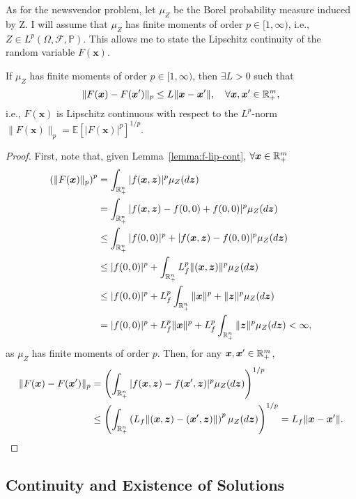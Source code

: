 \documentclass[12pt]{article}
\begin{document}
As for the newsvendor problem, let $\mu_Z$ be the Borel probability measure induced by Z.
I will assume that $\mu_Z$ has finite moments of order $p\in [1,\infty)$, i.e., $Z \in L^{p}(\Omega,\mathcal{F},\mathbb{P})$.
This allows me to state the Lipschitz continuity of the random variable $F(\bm{x})$.
\begin{lemma}[\citet{burtscheidtBilevelLinearOptimization2020}, Lemma~17.2.4\footnote{Except the case for probability measures with finite moments of order $p=\infty$.}]\label{lemma:F-lip-cont}
    If $\mu_Z$ has finite moments of order $p\in [1,\infty)$, then $\exists L>0$ such that \[
	\|F(\bm{x}) - F(\bm{x}')\|_p \le L \|\bm{x} - \bm{x}'\|,\quad \forall \bm{x},\bm{x}' \in \mathbb{R}^{m}_{+}
    ,\] i.e., $F(\bm{x})$ is Lipschitz continuous with respect to the $L^p$-norm $\|F(\bm{x})\|_p = \mathbb{E}[|F(\bm{x})|^{p}]^{1 / p}$.
\end{lemma}
\begin{proof}
    First, note that, given Lemma~\ref{lemma:f-lip-cont}, $\forall \bm{x} \in \mathbb{R}^{m}_{+}$
    \begin{align*}
	\left( \|F(\bm{x})\|_p \right)^{p} &= \int_{\mathbb{R}^{n}_{+}} |f(\bm{x},\bm{z})|^{p} \mu_Z(d\bm{z})  \\
	&= \int_{\mathbb{R}^{n}_{+}} |f(\bm{x},\bm{z}) - f(0,0) + f(0,0)|^{p} \mu_Z(d\bm{z})  \\
	&\le  \int_{\mathbb{R}^{n}_{+}} |f(0,0)|^{p} + |f(\bm{x},\bm{z}) - f(0,0)|^{p} \mu_Z(d\bm{z})  \\
	&\le |f(0,0)|^{p} + \int_{\mathbb{R}^{n}_{+}} L_f^{p} \|(\bm{x},\bm{z})\|^{p} \mu_Z(d\bm{z}) \\
	&\le |f(0,0)|^{p} + L_f^{p} \int_{\mathbb{R}^{n}_{+}} \|\bm{x}\|^{p} + \|\bm{z}\|^{p} \mu_Z(d\bm{z}) \\
	&= |f(0,0)|^{p} + L_f^{p} \|\bm{x}\|^{p} + L_f^{p} \int_{\mathbb{R}^{n}_{+}}\|\bm{z}\|^{p} \mu_Z(d\bm{z}) < \infty
    ,\end{align*}
    as $\mu_Z$ has finite moments of order $p$.
    Then, for any $\bm{x},\bm{x}' \in \mathbb{R}^{m}_{+}$,
    \begin{align*}
        \|F(\bm{x}) - F(\bm{x}')\|_{p} &= \left( \int_{\mathbb{R}^{n}_{+}} |f(\bm{x},\bm{z}) - f(\bm{x}',\bm{z})|^{p}\mu_Z(d\bm{z}) \right)^{1 / p} \\ 
	&\le \left( \int_{\mathbb{R}^{n}_{+}} \left( L_f \|(\bm{x},\bm{z}) - (\bm{x}',\bm{z})\| \right)^{p}\mu_Z(d\bm{z}) \right)^{1 / p} =  L_f \|\bm{x}-\bm{x}'\|
    .\end{align*}
\end{proof}

\subsection*{Continuity and Existence of Solutions}
\end{document}
